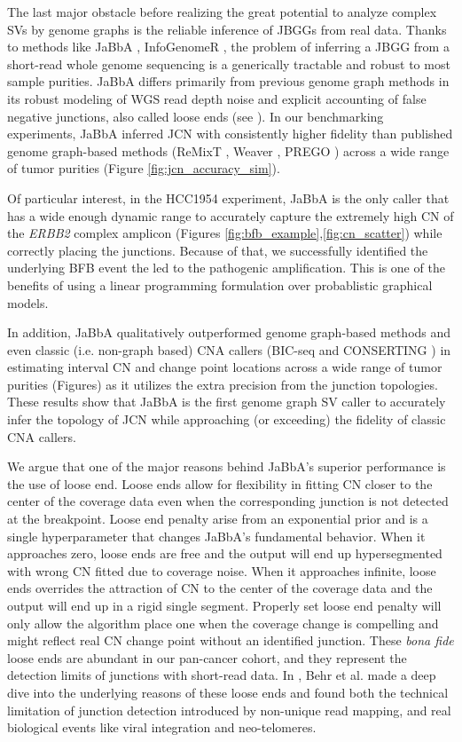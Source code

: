 \documentclass[phd,tocprelim]{cornell}
\begin{document}
The last major obstacle before realizing the great potential to analyze complex SVs by genome graphs is the reliable inference of JBGGs from real data. Thanks to methods like JaBbA \cite{Hadi2020-um}, InfoGenomeR \cite{Lee2021-rl}, the problem of inferring a JBGG from a short-read whole genome sequencing is a generically tractable and robust to most sample purities. JaBbA differs primarily from previous genome graph methods in its robust modeling of WGS read depth noise and explicit accounting of false negative junctions, also called loose ends (see ). In our benchmarking experiments, JaBbA inferred JCN with consistently higher fidelity than published genome graph-based methods (ReMixT \cite{McPherson2017-ry}, Weaver \cite{Li2016-qa}, PREGO \cite{Oesper2012-vw}) across a wide range of tumor purities (Figure \ref{fig:jcn_accuracy_sim}).

Of particular interest, in the HCC1954 experiment, JaBbA is the only caller that has a wide enough dynamic range to accurately capture the extremely high CN of the \textit{ERBB2} complex amplicon (Figures \ref{fig:bfb_example},\ref{fig:cn_scatter}) while correctly placing the junctions. Because of that, we successfully identified the underlying BFB event the led to the pathogenic amplification. This is one of the benefits of using a linear programming formulation over probablistic graphical models.

In addition, JaBbA qualitatively outperformed genome graph-based methods and even classic (i.e. non-graph based) CNA callers (BIC-seq \cite{Xi2011-oa} and CONSERTING \cite{Chen2015-sw}) in estimating interval CN and change point locations across a wide range of tumor purities (Figures) as it utilizes the extra precision from the junction topologies. These results show that JaBbA is the first genome graph SV caller to accurately infer the topology of JCN while approaching (or exceeding) the fidelity of classic CNA callers.

We argue that one of the major reasons behind JaBbA's superior performance is the use of loose end. Loose ends allow for flexibility in fitting CN closer to the center of the coverage data even when the corresponding junction is not detected at the breakpoint. Loose end penalty \textlambda arise from an exponential prior and is a single hyperparameter that changes JaBbA's fundamental behavior. When it approaches zero, loose ends are free and the output will end up hypersegmented with wrong CN fitted due to coverage noise. When it approaches infinite, loose ends overrides the attraction of CN to the center of the coverage data and the output will end up in a rigid single segment. Properly set loose end penalty will only allow the algorithm place one when the coverage change is compelling and might reflect real CN change point without an identified junction. These \textit{bona fide} loose ends are abundant in our pan-cancer cohort, and they represent the detection limits of junctions with short-read data. In \cite{Behr2021-gf}, Behr et al. made a deep dive into the underlying reasons of these loose ends and found both the technical limitation of junction detection introduced by non-unique read mapping, and real biological events like viral integration and neo-telomeres.
\end{document}

